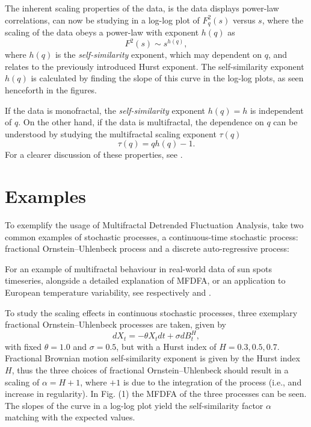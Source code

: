 \documentclass[pre, a4paper, aps, floatfix, superscriptaddress, onecolumn, notitlepage, longbibliography]{revtex4-1} %
\begin{document}
The inherent scaling properties of the data, is the data displays power-law correlations, can now be studying in a log-log plot of $F_q^2(s)$ versus $s$, where the scaling of the data obeys a power-law with exponent $h(q)$ as
\begin{equation}
  F^2(s) \sim s^{h(q)},\nonumber
\end{equation}
where $h(q)$ is the \textit{self-similarity} exponent, which may dependent on $q$, and relates to the previously introduced Hurst exponent.
The self-similarity exponent $h(q)$ is calculated by finding the slope of this curve in the log-log plots, as seen henceforth in the figures.

If the data is monofractal, the \textit{self-similarity} exponent $h(q)=h$ is independent of $q$.
On the other hand, if the data is multifractal, the dependence on $q$ can be understood by studying the multifractal scaling exponent $\tau(q)$ \cite{Barabasi1991}
\begin{equation}
  \tau(q) = qh(q) - 1.\nonumber
\end{equation}
For a clearer discussion of these properties, see \cite{Kantelhardt2002,Barabasi1991}.


\section{Examples}

To exemplify the usage of Multifractal Detrended Fluctuation Analysis, take two common examples of stochastic processes, a continuous-time stochastic process: fractional Ornstein--Uhlenbeck process and a discrete auto-regressive process:

For an example of multifractal behaviour in real-world data of sun spots timeseries, alongside a detailed explanation of MFDFA, or an application to European temperature variability, see respectively \cite{Movahed2006} and \cite{Meyer2019}.

To study the scaling effects in continuous stochastic processes, three exemplary fractional Ornstein--Uhlenbeck processes are taken, given by
\begin{equation}
  dX_t = - \theta X_t dt + \sigma d B^H_t, \tag{(1)}
\end{equation}
with fixed $\theta=1.0$ and $\sigma=0.5$, but with a Hurst index of $H=0.3, 0.5, 0.7$.
Fractional Brownian motion self-similarity exponent is given by the Hurst index $H$, thus the three choices of fractional Ornstein--Uhlenbeck should result in a scaling of $\alpha = H+1$, where $+1$ is due to the integration of the process (i.e., and increase in regularity).
In Fig. (1) the MFDFA of the three processes can be seen.
The slopes of the curve in a log-log plot yield the self-similarity factor $\alpha$ matching with the expected values.
\end{document}
